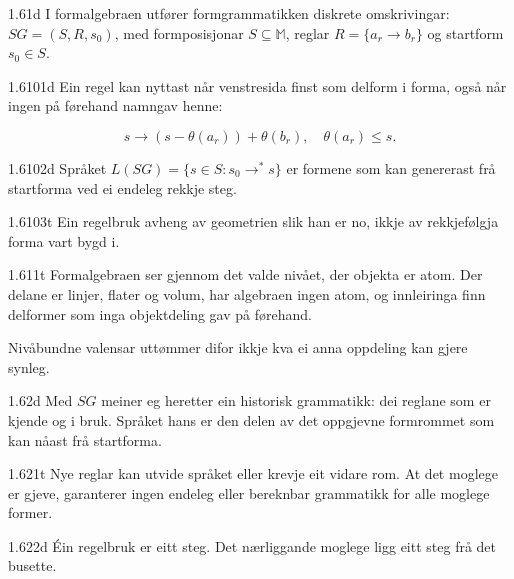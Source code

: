 \begin{formproposition}{1.61}{d}
I formalgebraen utfører formgrammatikken diskrete omskrivingar: \(SG=(S,R,s_0)\), med formposisjonar \(S\subseteq\mathbb{M}\), reglar \(R=\{a_r\to b_r\}\) og startform \(s_0\in S\).
\end{formproposition}

\begin{formproposition}{1.6101}{d}
Ein regel kan nyttast når venstresida finst som delform i forma, også når ingen på førehand namngav henne:

\[
s\longrightarrow(s-\theta(a_r))+\theta(b_r),\quad\theta(a_r)\leq s.
\]
\end{formproposition}

\begin{formproposition}{1.6102}{d}
Språket \(L(SG)=\{s\in S:s_0\to^{*}s\}\) er formene som kan genererast frå startforma ved ei endeleg rekkje steg.
\end{formproposition}

\begin{formproposition}{1.6103}{t}
Ein regelbruk avheng av geometrien slik han er no, ikkje av rekkjefølgja forma vart bygd i.
\end{formproposition}

\begin{formproposition}{1.611}{t}
Formalgebraen ser gjennom det valde nivået, der objekta er atom. Der delane er linjer, flater og volum, har algebraen ingen atom, og innleiringa finn delformer som inga objektdeling gav på førehand.

Nivåbundne valensar uttømmer difor ikkje kva ei anna oppdeling kan gjere synleg.
\end{formproposition}

\begin{formproposition}{1.62}{d}
Med \(SG\) meiner eg heretter ein historisk grammatikk: dei reglane som er kjende og i bruk. Språket hans er den delen av det oppgjevne formrommet som kan nåast frå startforma.
\end{formproposition}

\begin{formproposition}{1.621}{t}
Nye reglar kan utvide språket eller krevje eit vidare rom. At det moglege er gjeve, garanterer ingen endeleg eller bereknbar grammatikk for alle moglege former.
\end{formproposition}

\begin{formproposition}{1.622}{d}
Éin regelbruk er eitt steg. Det nærliggande moglege ligg eitt steg frå det busette.
\end{formproposition}

